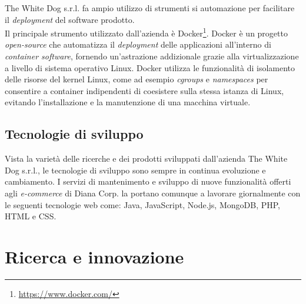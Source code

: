 The White Dog s.r.l. fa ampio utilizzo di strumenti si automazione per facilitare il \textit{deployment} del software prodotto. \\
Il principale strumento utilizzato dall'azienda è Docker\footnote[10]{\url{https://www.docker.com/}}. Docker è un progetto \textit{open-source} che automatizza il \textit{deployment} delle applicazioni all'interno di \textit{container software}, fornendo un'astrazione addizionale grazie alla virtualizzazione a livello di sistema operativo Linux. Docker utilizza le funzionalità di isolamento delle risorse del kernel Linux, come ad esempio \textit{cgroups} e \textit{namespaces} per consentire a container indipendenti di coesistere sulla stessa istanza di Linux, evitando l'installazione e la manutenzione di una macchina virtuale.

\subsection{Tecnologie di sviluppo}

Vista la varietà delle ricerche e dei prodotti sviluppati dall'azienda The White Dog s.r.l., le tecnologie di sviluppo sono sempre in continua evoluzione e cambiamento. I servizi di mantenimento e sviluppo di nuove funzionalità offerti agli \textit{e-commerce} di Diana Corp. la portano  comunque a lavorare giornalmente con le seguenti tecnologie web come: Java, JavaScript, Node.js, MongoDB, PHP, HTML e CSS.

\section{Ricerca e innovazione}

